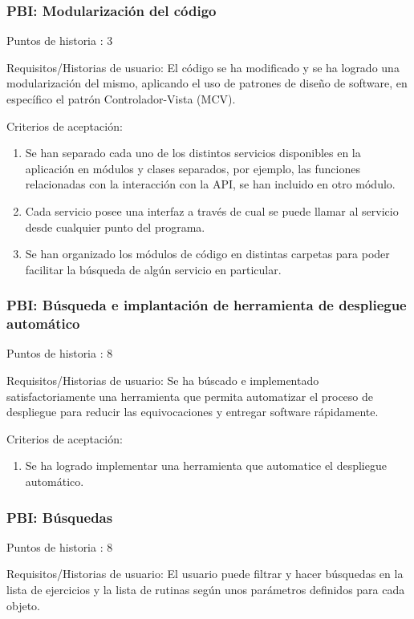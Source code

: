 \documentclass[11pt,a4paper]{report}
\begin{document}
\subsubsection{PBI: Modularización del código}
Puntos de historia : 3

Requisitos/Historias de usuario: El código se ha modificado y se ha logrado una modularización del mismo, aplicando el uso de patrones de diseño de software, en específico el patrón Controlador-Vista (MCV).

Criterios de aceptación:
\begin{enumerate}
	\item Se han separado cada uno de los distintos servicios disponibles en la aplicación en módulos y clases separados, por ejemplo, las funciones relacionadas con la interacción con la API, se han incluido en otro módulo.
	
	\item Cada servicio posee una interfaz a través de cual se puede llamar al servicio desde cualquier punto del programa.
	
	\item Se han organizado los módulos de código en distintas carpetas para poder facilitar la búsqueda de algún servicio en particular.
	
\end{enumerate}
\subsubsection{PBI: Búsqueda e implantación de herramienta de despliegue automático}
Puntos de historia : 8

Requisitos/Historias de usuario: Se ha búscado e implementado satisfactoriamente una herramienta que permita automatizar el proceso de despliegue para reducir las equivocaciones y entregar software rápidamente.

Criterios de aceptación:
\begin{enumerate}
	\item Se ha logrado implementar una herramienta que automatice el despliegue automático.
\end{enumerate}
\subsubsection{PBI: Búsquedas}
Puntos de historia : 8

Requisitos/Historias de usuario: El usuario puede filtrar y hacer búsquedas en la lista de ejercicios y la lista de rutinas según unos parámetros definidos para cada objeto.
\end{document}
